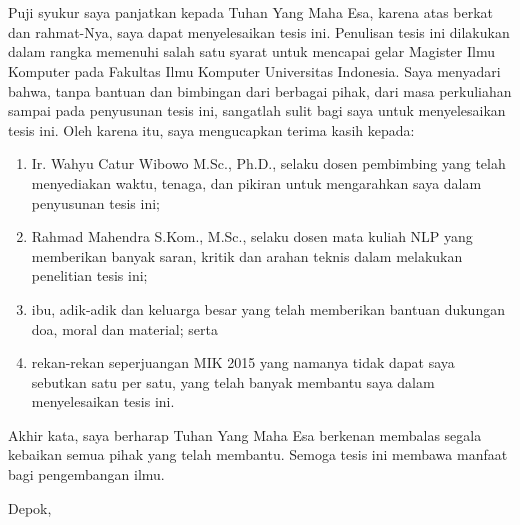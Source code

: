 \chapter*{\kataPengantar}

Puji syukur saya panjatkan kepada Tuhan Yang Maha Esa, karena atas berkat dan rahmat-Nya, saya dapat menyelesaikan tesis ini. Penulisan tesis ini dilakukan dalam rangka memenuhi salah satu syarat untuk mencapai gelar Magister Ilmu Komputer pada Fakultas Ilmu Komputer Universitas Indonesia. Saya menyadari bahwa, tanpa bantuan dan bimbingan dari berbagai pihak, dari masa perkuliahan sampai pada penyusunan tesis ini, sangatlah sulit bagi saya untuk menyelesaikan tesis ini. Oleh karena itu, saya mengucapkan terima kasih kepada:

\begin{enumerate}
	\item Ir. Wahyu Catur Wibowo M.Sc., Ph.D., selaku dosen pembimbing yang telah menyediakan waktu, tenaga, dan pikiran untuk mengarahkan saya dalam penyusunan tesis ini;
	\item Rahmad Mahendra S.Kom., M.Sc., selaku dosen mata kuliah NLP yang memberikan banyak saran, kritik dan arahan teknis dalam melakukan penelitian tesis ini;
	\item ibu, adik-adik dan keluarga besar yang telah memberikan bantuan dukungan doa, moral dan material; serta
	\item rekan-rekan seperjuangan MIK 2015 yang namanya tidak dapat saya sebutkan satu per satu, yang telah banyak membantu saya dalam menyelesaikan tesis ini.
\end{enumerate}

Akhir kata, saya berharap Tuhan Yang Maha Esa berkenan membalas segala kebaikan semua pihak yang telah membantu. Semoga tesis ini membawa manfaat bagi pengembangan ilmu.

\vspace*{0.1cm}
\begin{flushright}
Depok, \tanggalPengesahan\\[0.1cm]
\vspace*{1cm}
\penulis

\end{flushright}